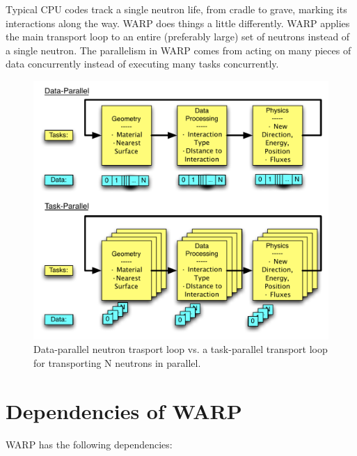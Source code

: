 \documentclass[twoside,a4paper]{refart}
\begin{document}
Typical CPU codes track a single neutron life, from cradle to grave, marking its interactions along the way.  WARP does things a little differently.  WARP applies the main transport loop to an entire (preferably large) set of neutrons instead of a single neutron.  The parallelism in WARP comes from acting on many pieces of data concurrently instead of executing many tasks concurrently.


\begin{figure}[h!] 
  \centering
    \includegraphics[width=\textwidth]{graphics/datavtask.pdf}
     \caption{Data-parallel neutron trasport loop vs. a task-parallel transport loop for transporting N neutrons in parallel.  \label{datavtask} }
\end{figure}

\section{Dependencies of WARP}

WARP has the following dependencies:
\end{document}
